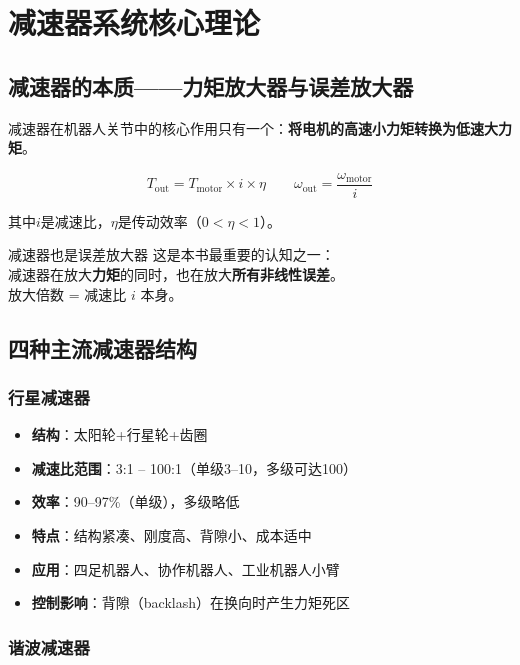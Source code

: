 \chapter{减速器系统核心理论}
\label{ch:gearbox}

\section{减速器的本质——力矩放大器与误差放大器}

减速器在机器人关节中的核心作用只有一个：\textbf{将电机的高速小力矩转换为低速大力矩}。

\begin{equation}
T_{\text{out}} = T_{\text{motor}} \times i \times \eta
\qquad
\omega_{\text{out}} = \frac{\omega_{\text{motor}}}{i}
\end{equation}

其中$i$是减速比，$\eta$是传动效率（$0 < \eta < 1$）。

\begin{keyinsight}{减速器也是误差放大器}
这是本书最重要的认知之一：\\
减速器在放大\textbf{力矩}的同时，也在放大\textbf{所有非线性误差}。\\
放大倍数 = 减速比 $i$ 本身。
\end{keyinsight}

\section{四种主流减速器结构}

\subsection{行星减速器}

\begin{itemize}
  \item \textbf{结构}：太阳轮+行星轮+齿圈
  \item \textbf{减速比范围}：3:1 -- 100:1（单级3--10，多级可达100）
  \item \textbf{效率}：90--97\%（单级），多级略低
  \item \textbf{特点}：结构紧凑、刚度高、背隙小、成本适中
  \item \textbf{应用}：四足机器人、协作机器人、工业机器人小臂
  \item \textbf{控制影响}：背隙（backlash）在换向时产生力矩死区
\end{itemize}

\subsection{谐波减速器}

